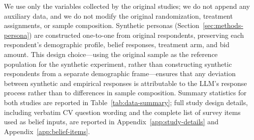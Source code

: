 \documentclass[12pt]{article}
\begin{document}
We use only the variables collected by the original studies; we do not append any auxiliary data, and we do not modify the original randomization, treatment assignments, or sample composition. Synthetic personas (Section~\ref{sec:methods-persona}) are constructed one-to-one from original respondents, preserving each respondent's demographic profile, belief responses, treatment arm, and bid amount. This design choice---using the original sample as the reference population for the synthetic experiment, rather than constructing synthetic respondents from a separate demographic frame---ensures that any deviation between synthetic and empirical responses is attributable to the LLM's response process rather than to differences in sample composition. Summary statistics for both studies are reported in Table~\ref{tab:data-summary}; full study design details, including verbatim CV question wording and the complete list of survey items used as belief inputs, are reported in Appendix~\ref{app:study-details} and Appendix~\ref{app:belief-items}.
\end{document}
